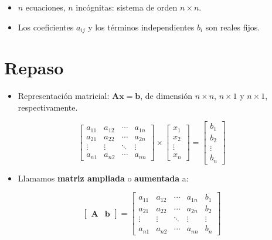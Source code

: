\documentclass[]{book}
\providecommand{\tightlist}{%
  \setlength{\itemsep}{0pt}\setlength{\parskip}{0pt}}
\begin{document}
\begin{itemize}
\tightlist
\item
  \(n\) ecuaciones, \(n\) incógnitas: sistema de orden \(n \times n\).
\item
  Los coeficientes \(a_{ij}\) y los términos independientes \(b_i\) son reales fijos.
\end{itemize}

\hypertarget{repaso}{%
\section{Repaso}\label{repaso}}

\begin{itemize}
\tightlist
\item
  Representación matricial: \(\mathbf{Ax=b}\), de dimensión \(n\times n\), \(n\times 1\) y \(n\times 1\), respectivamente.
\end{itemize}

\[
\begin{bmatrix}
a_{11} & a_{12} & \cdots & a_{1n} \\
a_{21} & a_{22} & \cdots & a_{2n} \\
\vdots & \vdots & \ddots & \vdots \\
a_{n1} & a_{n2} & \cdots & a_{nn} 
\end{bmatrix}
\times 
\begin{bmatrix}
x_1 \\ x_2 \\ \vdots \\ x_n
\end{bmatrix}
=
\begin{bmatrix}
b_1 \\ b_2 \\ \vdots \\ b_n
\end{bmatrix}
\]

\begin{itemize}
\tightlist
\item
  Llamamos \textbf{matriz ampliada} o \textbf{aumentada} a:
\end{itemize}

\[
\begin{bmatrix}
    \mathbf{A} & \mathbf{b}
\end{bmatrix}
=
\begin{bmatrix}
a_{11} & a_{12} & \cdots & a_{1n} & b_1\\
a_{21} & a_{22} & \cdots & a_{2n} & b_2\\
\vdots & \vdots & \ddots & \vdots & \vdots\\
a_{n1} & a_{n2} & \cdots & a_{nn} & b_n 
\end{bmatrix}
\]
\end{document}
